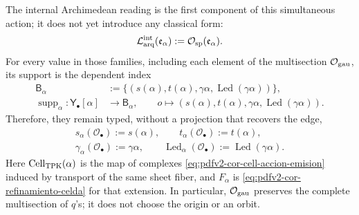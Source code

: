 The internal Archimedean reading is the first component of this simultaneous
action; it does not yet introduce any classical form:
\begin{equation}
\label{pII-full:eq:continuo-lector-arquimediano}
 \mathcal L_{\rm arq}^{\rm int}(\mathfrak e_\alpha)
 :=\mathcal O_{\rm sp}(\mathfrak e_\alpha).
\end{equation}
For every value in those families, including each element of the
multisection \(\mathcal O_{\rm gau}\), its support is the dependent index
\begin{equation}
\label{eq:pdfv2-cor-soporte-dependiente}
 \begin{aligned}
 \mathsf B_\alpha&:=
 \{(s(\alpha),t(\alpha),\gamma\alpha,
          \operatorname{Led}(\gamma\alpha))\},\\
 \operatorname{supp}_\alpha:\mathsf Y_\bullet[\alpha]&\longrightarrow
 \mathsf B_\alpha,\qquad
 o\longmapsto(s(\alpha),t(\alpha),\gamma\alpha,
          \operatorname{Led}(\gamma\alpha)).
 \end{aligned}
\end{equation}
Therefore, they remain typed, without a projection that recovers the edge,
\begin{equation}
\label{eq:pdfv2-cor-soporte-cinco-lecturas}
 \begin{gathered}
 s_\alpha(\mathcal O_\bullet):=s(\alpha),\qquad
 t_\alpha(\mathcal O_\bullet):=t(\alpha),\\
 \gamma_\alpha(\mathcal O_\bullet):=\gamma\alpha,
 \qquad
 \operatorname{Led}_\alpha(\mathcal O_\bullet)
 :=\operatorname{Led}(\gamma\alpha).
 \end{gathered}
\end{equation}
Here \(\operatorname{Cell}_{\rm TPK}(\alpha)\) is the map of complexes
\eqref{eq:pdfv2-cor-cell-accion-emision} induced by transport of the
same sheet fiber, and \(F_\alpha\) is
\eqref{eq:pdfv2-cor-refinamiento-celda} for that extension. In particular,
\(\mathcal O_{\rm gau}\) preserves the complete multisection of \(q\)'s; it does not
choose the origin or an orbit.

